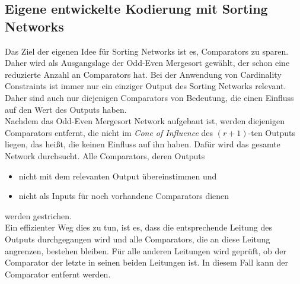 \documentclass[a4,abstract=on]{scrartcl}
\begin{document}
	\subsection{Eigene entwickelte Kodierung mit Sorting Networks}
Das Ziel der eigenen Idee für Sorting Networks ist es, Comparators zu sparen. Daher wird als Ausgangslage der Odd-Even Mergesort gewählt, der schon eine reduzierte Anzahl an Comparators hat. Bei der Anwendung von Cardinality Constraints ist immer nur ein einziger Output des Sorting Networks relevant. Daher sind auch nur diejenigen Comparators von Bedeutung, die einen Einfluss auf den Wert des Outputs haben.\\
Nachdem das Odd-Even Mergesort Network aufgebaut ist, werden diejenigen Comparators entfernt, die nicht im \textit{Cone of Influence} des $(r+1)$-ten Outputs liegen, das heißt, die keinen Einfluss auf ihn haben. Dafür wird das gesamte Network durchsucht. Alle Comparators, deren Outputs
\begin{itemize}
\item nicht mit dem relevanten Output übereinstimmen und
\item nicht als Inputs für noch vorhandene Comparators dienen
\end{itemize}
werden gestrichen. \\
Ein effizienter Weg dies zu tun, ist es, dass die entsprechende Leitung des Outputs durchgegangen wird und alle Comparators, die an diese Leitung angrenzen, bestehen bleiben. Für alle anderen Leitungen wird geprüft, ob der Comparator der letzte in seinen beiden Leitungen ist. In diesem Fall kann der Comparator entfernt werden.

\end{document}
